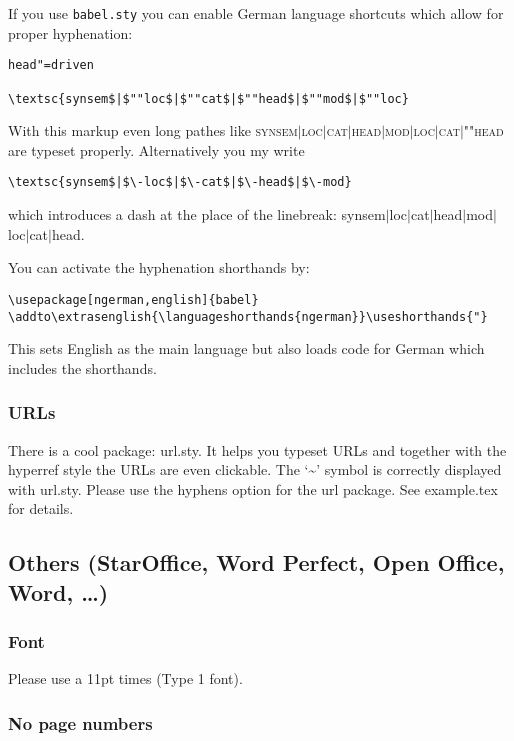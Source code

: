 \documentclass[11pt,a4paper,fleqn]{article}
\begin{document}
If you use \verb+babel.sty+ you can enable German language shortcuts which allow for proper hyphenation:
\begin{verbatim}
head"=driven

\textsc{synsem$|$""loc$|$""cat$|$""head$|$""mod$|$""loc}
\end{verbatim}
With this markup even long pathes like \textsc{synsem$|$loc$|$cat$|$head$|$mod$|$loc$|$cat$|$""head}
are typeset properly. Alternatively you my write
\begin{verbatim}
\textsc{synsem$|$\-loc$|$\-cat$|$\-head$|$\-mod}
\end{verbatim}
which introduces a dash at the place of the linebreak:
{\sc synsem$|$\-loc$|$\-cat$|$\-head$|$\-mod$|$\-loc$|$\-cat$|$\-head}.

You can activate the hyphenation shorthands by:
\begin{verbatim}
\usepackage[ngerman,english]{babel}
\addto\extrasenglish{\languageshorthands{ngerman}}\useshorthands{"}
\end{verbatim}
This sets English as the main language but also loads code for German which includes the shorthands.

\subsubsection{URLs}

There is a cool package: url.sty. It helps you typeset URLs and together with the hyperref style the
URLs are even clickable. The `\~{}' symbol is correctly displayed with url.sty. Please use the
hyphens option for the url package. See example.tex for details.





\subsection{Others (StarOffice, Word Perfect, Open Office, Word, \ldots)}

\subsubsection{Font}

Please use a 11pt times (Type 1 font). 

\subsubsection{No page numbers}
\end{document}
